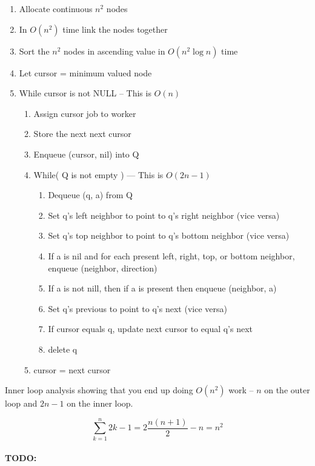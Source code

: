 \documentclass{article}
\begin{document}
\begin{enumerate}
	\item Allocate continuous $n^2$ nodes
	\item In $O(n^2)$ time link the nodes together
	\item Sort the $n^2$ nodes in ascending value in $O(n^2 \log n)$ time
	\item Let cursor = minimum valued node
	\item While cursor is not NULL -- This is $O(n)$
	\begin{enumerate}
		\item Assign cursor job to worker
		\item Store the next next cursor
		\item Enqueue (cursor, nil) into Q
		\item While( Q is not empty )  --- This is $O(2n - 1)$
		\begin{enumerate}
			\item Dequeue (q, a) from Q
			\item Set q's left neighbor to point to q's right neighbor (vice versa)
			\item Set q's top neighbor to point to q's bottom neighbor (vice versa)
			\item If a is nil and for each present left, right, top, or bottom neighbor, enqueue (neighbor, direction)
			\item If a is not nill, then if a is present then enqueue (neighbor, a)
			\item Set q's previous to point to q's next (vice versa)
			\item If cursor equals q, update next cursor to equal q's next
			\item delete q
		\end{enumerate}
		\item cursor = next cursor
	\end{enumerate}
\end{enumerate}

Inner loop analysis showing that you end up doing $O(n^2)$ work -- $n$ on the outer loop and $2n - 1$ on the inner loop.

\begin{equation}
	\sum_{k = 1}^{n} 2k - 1 = 2 \frac{n (n + 1)}{2} - n = n^2
\end{equation}

\paragraph{TODO:}
\end{document}
